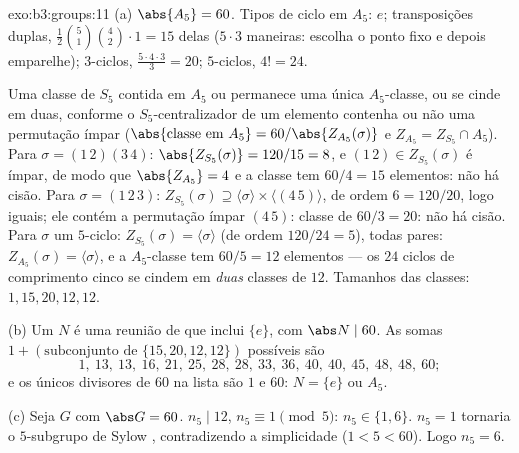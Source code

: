 \begin{solution}{exo:b3:groups:11}
(a) $\abs{A_5} = 60$. Tipos de ciclo em $A_5$: $e$; transposições duplas,
$\frac{1}{2}\binom{5}{1}\binom{4}{2}\cdot 1 = 15$ delas ($5 \cdot 3$ maneiras: escolha o ponto fixo e depois emparelhe);
$3$-ciclos, $\frac{5 \cdot 4 \cdot 3}{3} = 20$; $5$-ciclos, $4! =
24$.

Uma classe de $S_5$ contida em $A_5$ ou permanece uma única
$A_5$-classe, ou se cinde em duas, conforme o $S_5$-centralizador
de um elemento contenha ou não uma permutação ímpar ($\abs{\text{classe em }A_5} =
60/\abs{Z_{A_5}(\sigma)}$ e $Z_{A_5} = Z_{S_5} \cap A_5$). Para
$\sigma = (1\,2)(3\,4)$: $\abs{Z_{S_5}(\sigma)} = 120/15 = 8$, e $(1\,2) \in Z_{S_5}(\sigma)$ é ímpar, de modo que $\abs{Z_{A_5}} = 4$ e a classe tem $60/4 = 15$
elementos: não há cisão. Para $\sigma =
(1\,2\,3)$: $Z_{S_5}(\sigma) \supseteq \langle \sigma \rangle
\times \langle (4\,5)\rangle$, de ordem $6 = 120/20$, logo iguais;
ele contém a permutação ímpar $(4\,5)$: classe de $60/3 = 20$: não há
cisão. Para $\sigma$ um $5$-ciclo: $Z_{S_5}(\sigma) = \langle \sigma\rangle$ (de ordem $120/24 = 5$), todas
pares: $Z_{A_5}(\sigma) = \langle
\sigma\rangle$, e a $A_5$-classe tem $60/5 = 12$ elementos --- os $24$
ciclos de comprimento cinco se cindem em \emph{duas} classes de
$12$. Tamanhos das classes: $1, 15, 20, 12, 12$.

(b) Um  $N$ é uma reunião de 
que inclui $\{e\}$, com $\abs N \mid 60$. As somas $1 +
(\text{subconjunto de } \{15, 20, 12, 12\})$ possíveis são
\[
1,\ 13,\ 13,\ 16,\ 21,\ 25,\ 28,\ 28,\ 33,\ 36,\ 40,\ 40,\ 45,\
48,\ 48,\ 60 ;
\]
e os únicos divisores de $60$ na lista são $1$ e $60$: $N =
\{e\}$
ou $A_5$.

(c) Seja $G$  com $\abs G = 60$. $n_5 \mid 12$, $n_5
\equiv 1 \pmod 5$: $n_5 \in \{1, 6\}$. $n_5 = 1$ tornaria o
$5$-subgrupo de Sylow , contradizendo a simplicidade ($1 < 5 <
60$).
Logo $n_5 = 6$.
\end{solution}

